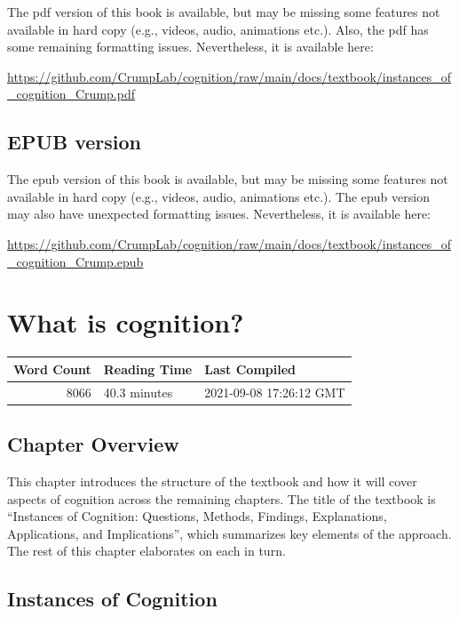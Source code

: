 \documentclass[
  oneside,
  12pt]{crumpbook}
\begin{document}
The pdf version of this book is available, but may be missing some features not available in hard copy (e.g., videos, audio, animations etc.). Also, the pdf has some remaining formatting issues. Nevertheless, it is available here:

\url{https://github.com/CrumpLab/cognition/raw/main/docs/textbook/instances_of_cognition_Crump.pdf}

\hypertarget{epub-version}{%
\section{EPUB version}\label{epub-version}}

The epub version of this book is available, but may be missing some features not available in hard copy (e.g., videos, audio, animations etc.). The epub version may also have unexpected formatting issues. Nevertheless, it is available here:

\url{https://github.com/CrumpLab/cognition/raw/main/docs/textbook/instances_of_cognition_Crump.epub}

\hypertarget{what-is-cognition}{%
\chapter{What is cognition?}\label{what-is-cognition}}

\begin{tabular}{r|l|l}
\hline
Word Count & Reading Time & Last Compiled\\
\hline
8066 & 40.3 minutes & 2021-09-08 17:26:12 GMT\\
\hline
\end{tabular}

\hypertarget{chapter-overview}{%
\section{Chapter Overview}\label{chapter-overview}}

This chapter introduces the structure of the textbook and how it will cover aspects of cognition across the remaining chapters. The title of the textbook is ``Instances of Cognition: Questions, Methods, Findings, Explanations, Applications, and Implications'', which summarizes key elements of the approach. The rest of this chapter elaborates on each in turn.

\hypertarget{instances-of-cognition}{%
\section{Instances of Cognition}\label{instances-of-cognition}}
\end{document}
